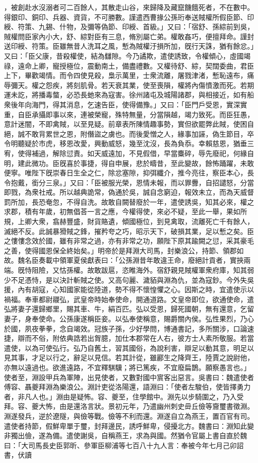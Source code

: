 \begin{pinyinscope}
，被創赴水沒溺者可二百餘人，其散走山谷，來歸降及藏竄饑餓死者，不在數中。得銀印、銅印、兵器、資貨，不可勝數。謹遣西曹掾公孫珩奉送賊權所假臣節、印綬、符策、九錫、什物，及彌等偽節、印綬、首級。」又曰：「宿舒、孫綜前到吳，賊權問臣家內小大，舒、綜對臣有三息，脩別屬亡弟。權敢姦巧，便擅拜命。謹封送印綬、符策。臣雖無昔人洗耳之風，慙為賊權汙損所加，旣行天誅，猶有餘忿。」又曰：「臣父康，昔殺權使，結為讎隙。今乃譎欺，遣使誘致，令權傾心，虛國竭祿，遠命上卿，寵授極位，震動南土，備盡禮數。又權待舒、綜，契闊委曲，君臣上下，畢歡竭情。而令四使見殺，梟示萬里，士衆流離，屠戮津渚，慙恥遠布，痛辱彌天。權之怨疾，將刻肌骨。若天衰其業，使至喪隕，權將內傷憤激而死。若期運未訖，將播毒螫，必恐長虵來為寇害。徐州諸屯及城陽諸郡，與相接近，如有船衆後年向海門，得其消息，乞速告臣，使得備豫。」又曰：「臣門戶受恩，實深實重，自臣承攝即事以來，連被榮寵，殊特無量，分當隕越，竭力致死。而臣狂愚，意計迷闇，不即禽賊，以至見疑。前章表所陳情趣事勢，實但欲罷弊此賊，使困自絕，誠不敢背累世之恩，附僭盜之虜也。而後愛憎之人，緣事加誣，偽生節目，卒令明聽疑於市虎，移恩改愛，興動威怒，幾至沈沒，長為負忝。幸賴慈恩，猶垂三宥，使得補過，解除愆責。如天威遠加，不見假借，早當麋碎，辱先廢祀，何緣自明，建此微功。臣旣喜於事捷，得自申展，悲於疇昔，至此變故，餘怖踊躍，未敢便寧。唯陛下旣崇春日生全之仁，除忿塞隙，抑弭纖介，推今亮往，察臣本心，長令抱戴，銜分三泉。」又曰：「臣被服光榮，恩情未報，而以罪釁，自招譴怒，分當即戮，為衆社戒。所以越典詭常，偽通於吳，誠自念窮迫，報效未立，而為天威督罰所加，長恐奄忽，不得自洗。故敢自闕替廢於一年，遣使誘吳，知其必來，權之求郡，積有年歲，初無倡荅一言之應，今權得使，來必不疑，至此一舉，果如所規，上卿大衆，翕赫豐盛，財貨賂遺，傾國極位，到見禽取，流離死亡千有餘人，滅絕不反。此誠暴猾賊之鋒，摧矜夸之巧，昭示天下，破損其業，足以慙之矣。臣之慺慺念效於國，雖有非常之過，亦有非常之功，願陛下原其踰闕之愆，采其豪毛之善，使得國恩保全終始矣。」明帝於是拜淵大司馬，封樂浪公，持節、領郡如故。魏名臣奏載中領軍夏侯獻表曰：「公孫淵昔年敢違王命，廢絕計貢者，實挾兩端。旣恃阻險，又怙孫權。故敢跋扈，恣睢海外。宿舒親見賊權軍衆府庫，知其弱少不足憑恃，是以決計斬賊之使。又高句麗、濊貊與淵為仇，並為寇鈔。今外失吳援，內有胡寇，心知國家能從陸道，勢不得不懷惶懼之心。因斯之時，宜遣使示以禍福。奉車都尉鬷弘，武皇帝時始奉使命，開通道路。文皇帝即位，欲通使命，遣弘將妻子還歸鄉里，賜其車、牛，絹百匹。弘以受恩，歸死國朝，無有還意，乞留妻子，身奉使命。公孫康遂稱臣妾。以弘奉使稱意，賜爵關內侯。弘性果烈，乃心於國，夙夜拳拳，念自竭效。冠族子孫，少好學問，博通書記，多所關涉，口論速捷，辯而不俗，附依典誥若出胷臆，加仕本郡常在人右，彼方士人素所敬服。若當遣使，以為可使弘行。弘乃自舊土，習其國俗，為說利害，辯足以動其意，明足以見其事，才足以行之，辭足以見信。若其計從，雖酈生之降齊王，陸賈之說尉他，亦無以遠過也。欲進遠路，不宜釋騏驥；將已篤疾，不宜廢扁鵲。願察愚言也。」使者至，淵設甲兵為軍陣，出見使者，又數對國中賔客出惡言。吳書曰：魏遣使者傅容、聶夔拜淵為樂浪公。淵計吏從洛陽還，語淵曰：「使者左駿伯，使皆擇勇力者，非凡人也。」淵由是疑怖。容、夔至，住學館中。淵先以步騎圍之，乃入受拜。容、夔大怖，由是還洛言狀。景初元年，乃遣幽州刺史毌丘儉等齎璽書徵淵。淵遂發兵，逆於遼隧，與儉等戰。儉等不利而還。淵遂自立為燕王，置百官有司。遣使者持節，假鮮卑單于璽，封拜邊民，誘呼鮮卑，侵擾北方。魏書曰：淵知此變非獨出儉，遂為備。遣使謝吳，自稱燕王，求為與國。然猶令官屬上書自直於魏曰：「大司馬長史臣郭昕、參軍臣柳浦等七百八十九人言：奉被今年七月己卯詔書，伏讀
\end{pinyinscope}
